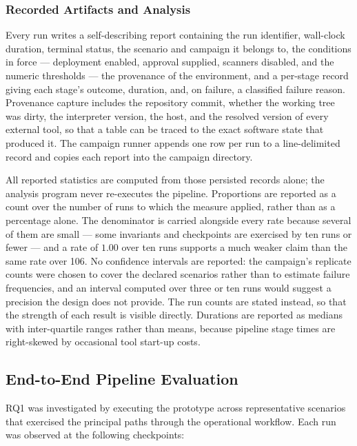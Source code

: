 \subsubsection{Recorded Artifacts and Analysis}

Every run writes a self-describing report containing the run identifier,
wall-clock duration, terminal status, the scenario and campaign it belongs to,
the conditions in force --- deployment enabled, approval supplied, scanners
disabled, and the numeric thresholds --- the provenance of the environment, and
a per-stage record giving each stage's outcome, duration, and, on failure, a
classified failure reason. Provenance capture includes the repository commit,
whether the working tree was dirty, the interpreter version, the host, and the
resolved version of every external tool, so that a table can be traced to the
exact software state that produced it. The campaign runner appends one row per
run to a line-delimited record and copies each report into the campaign
directory.

All reported statistics are computed from those persisted records alone; the analysis program never re-executes the
pipeline. Proportions are reported as a count over the number of runs to which
the measure applied, rather than as a percentage alone. The denominator is
carried alongside every rate because several of them are small --- some
invariants and checkpoints are exercised by ten runs or fewer --- and a rate of
$1.00$ over ten runs supports a much weaker claim than the same rate over 106.
No confidence intervals are reported: the campaign's replicate counts were
chosen to cover the declared scenarios rather than to estimate failure
frequencies, and an interval computed over three or ten runs would suggest a
precision the design does not provide. The run counts are stated instead, so
that the strength of each result is visible directly. Durations are reported as
medians with inter-quartile ranges rather than means, because pipeline stage
times are right-skewed by occasional tool start-up costs.

\subsection{End-to-End Pipeline Evaluation}
\label{subsec:evaluation-rq1}

RQ1 was investigated by executing the prototype across representative scenarios that
exercised the principal paths through the operational workflow. Each run was observed at
the following checkpoints:

